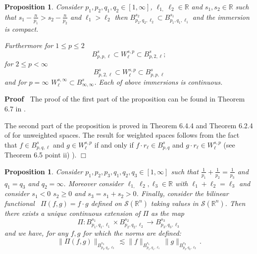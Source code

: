 \documentclass[a4paper,10pt]{article}
\newenvironment{proof}{\noindent\textbf{Proof\ }}{\hspace*{\fill}$\Box$\medskip}
\newtheorem{proposition}[theorem]{Proposition}
{\theorembodyfont{\rmfamily}\newtheorem{remark}[theorem]{Remark}}
\begin{document}
\begin{proposition}
  \label{proposition_inclusion}Consider $p_1, p_2, q_1, q_2 \in [1, \infty]$,
  $\ell_{1,} \ell_2 \in \mathbb{R}$ and $s_1, s_2 \in \mathbb{R}$ such that
  $s_1 - \frac{n}{p_1} > s_2 - \frac{n}{p_2}$ and $\ell_1 > \ell_2$ then
  $B^{s_2}_{p_2, q_2, \ell_2} \subset B^{s_1}_{p_1, q_1, \ell_1}$ and the
  immersion is compact.
  
  Furthermore for $1 \leq p \leq 2$
  \[ B^s_{p, p, \ell} \subset W^{s, p}_{\ell} \subset B^s_{p, 2, \ell} ; \]
  for $2 \leq p < \infty$
  \[ B^s_{p, 2, \ell} \subset W^{s, p}_{\ell} \subset B^s_{p, p, \ell} \]
  and for $p = \infty$ $W^{s, \infty}_{\ell} \subset B^s_{\infty, \infty}$.
  Each of above immersions is continuous. 
\end{proposition}

\begin{proof}
  The proof of the first part of the proposition can be found in Theorem 6.7
  in {\cite{Triebel2006}}.
  
  The second part of the proposition is proved in Theorem 6.4.4 and Theorem
  6.2.4 of {\cite{Joran1976}} for unweighted spaces. The result for weighted
  spaces follows from the fact that $f \in B^s_{p, q, \ell}$ and $g \in W^{s,
  p}_{\ell}$ if and only if $f \cdot r_{\ell} \in B^s_{p, q}$ and $g \cdot
  r_{\ell} \in W^{s, p}_{\ell}$ (see {\cite{Triebel2006}} Theorem 6.5 point
  ii) ). 
\end{proof}

\begin{proposition}
  \label{propisition_product}Consider $p_1, p_2, p_3, q_1, q_2, q_3 \in [1,
  \infty]$ such that $\frac{1}{p_1} + \frac{1}{p_2} = \frac{1}{p_3}$ and $q_1
  = q_3$ and $q_2 = \infty$. Moreover consider $\ell_{1,} \ell_2, \ell_3 \in
  \mathbb{R}$ with $\ell_1 + \ell_2 = \ell_3$ and consider $s_1 < 0$ $s_2 \geq
  0$ and $s_3 = s_1 + s_2 > 0$. Finally, consider the bilinear functional \
  $\Pi (f, g) = f \cdot g$ defined on $\mathcal{S} (\mathbb{R}^n)$ taking
  values in $\mathcal{S} (\mathbb{R}^n)$. Then there exists a unique
  continuous extension of $\Pi$ as the map
  \[ \Pi : B^{s_1}_{p_1, q_1, \ell_1} \times B^{s_2}_{p_2, q_2, \ell_2}
     \rightarrow B^{s_3}_{p_3, q_3, \ell_3} \]
  and we have, for any $f, g$ for which the norms are defined:
  \[ \| \Pi (f, g) \|_{B^{s_3}_{p_3, q_3, \ell_3}} \lesssim \| f
     \|_{B^{s_1}_{p_1, q_1, \ell_1}} \| g \|_{B^{s_2}_{p_2, q_2, \ell_2}} . \]
\end{proposition}
\end{document}
